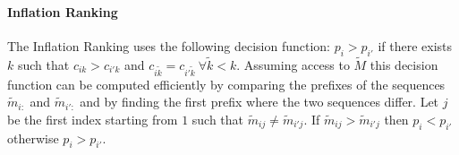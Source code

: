 \documentclass[14pt]{article}
\newcommand{\tk}[0]{\tilde{k}}
\newcommand{\tM}[0]{\tilde{M}}
\newcommand{\tm}[0]{\tilde{m}}
\begin{document}
\paragraph{Inflation Ranking}
The Inflation Ranking uses the following decision function:
$p_{i} > p_{i'}$ if there exists $k$ such that $c_{ik} > c_{i'k}$ and
$c_{i\tk} = c_{i'\tk}\ \forall \tk < k$. Assuming access to $\tM$ this
decision function can be computed efficiently by comparing the prefixes of
the sequences $\tm_{i:}$ and $\tm_{i':}$ and by finding the first prefix where
the two sequences differ. Let $j$ be the first index starting from $1$ such
that $\tm_{ij} \ne \tm_{i'j}$. If $\tm_{ij} > \tm_{i'j}$ then $p_{i} < p_{i'}$
otherwise $p_i > p_{i'}$.

% 
% 
\end{document}
